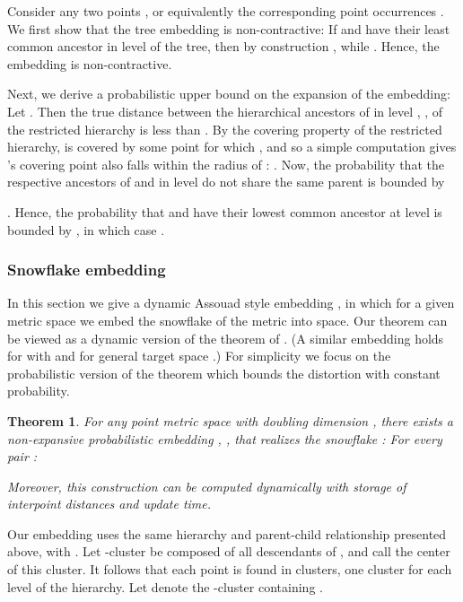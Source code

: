 \documentclass[11pt]{article}
\newtheorem{theorem}{Theorem}
\newenvironment{proof}{{\bf Proof:\ }}{\hfill\medskip}
\begin{document}
\begin{proof}
Consider any two points , or equivalently the corresponding point occurrences
. We first show that the tree embedding is non-contractive: If  and 
have their least common ancestor in level  of the tree, then by construction
, while
.
Hence, the embedding is non-contractive.

Next, we derive a probabilistic upper bound on the expansion of the embedding: Let
. Then the true distance between the hierarchical ancestors
of  in level , , of the restricted hierarchy is less than
.
By the covering property of the restricted hierarchy,  is covered by some point
 for which , and so a simple
computation gives 's covering point  also falls within the radius
 of :
.
Now, the probability that the respective ancestors of  and  in level 
do not share the same parent is bounded by

\cite{AbBaNe08}. Hence, the probability that  and  have their lowest common
ancestor at
level  is bounded by , in which case
.
\end{proof}


\subsubsection{Snowflake embedding}\label{sec:dyn-snow}

In this section we give a dynamic Assouad style embedding \cite{Assouad83}, in which
for a given metric space  we embed the snowflake  of the metric
into  space. Our theorem can be viewed as a dynamic version of the theorem
of \cite{GuKrLe03,AbBaNe08}. (A similar embedding holds for  with  and for general target space .) For simplicity we focus on the
probabilistic version of the theorem which bounds the distortion with constant
probability.

\begin{theorem}\label{thm:snowflake}
For any  point metric space  with doubling dimension , there
exists a non-expansive probabilistic embedding ,
, that realizes the snowflake : For every pair
:

Moreover, this construction can be computed dynamically with storage of  interpoint
distances and  update time.
\end{theorem}

Our embedding uses the same hierarchy and parent-child relationship presented above,
with . Let -cluster  be composed of all descendants of , and call  the center of this cluster. It follows that each point is
found in  clusters, one cluster for each level of the hierarchy. Let
 denote the -cluster containing .
\end{document}
